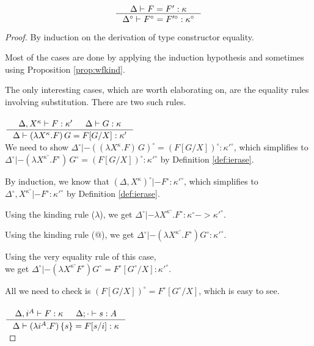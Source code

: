 \begin{theorem}
\[ \inference{\Delta |- F=F':\kappa}
		{\Delta^\circ |- F^\circ=F'^\circ:\kappa^\circ}
\]
\label{thm:ierasetyconeq}
\end{theorem}
\begin{proof}
By induction on the derivation of type constructor equality.

Most of the cases are done by applying the induction hypothesis
and sometimes using Proposition \ref{prop:wfkind}.

The only interesting cases, which are worth elaborating on, are the
equality rules involving substitution.  There are two such rules.

\paragraph{}
  $\inference{\Delta,X^\kappa |- F:\kappa' & \Delta |- G:\kappa}
             {\Delta |- (\lambda X^\kappa.F)\,G = F[G/X]:\kappa'}$ \\

We need to show
$ \Delta^\circ |- ((\lambda X^\kappa.F)\,G)^\circ = (F[G/X])^\circ : \kappa'^\circ $,
which simplifies to 
$ \Delta^\circ |- (\lambda X^{\kappa^\circ}.F^\circ)\,G^\circ = (F[G/X])^\circ : \kappa'^\circ $
by Definition \ref{def:ierase}.

By induction, we know that $(\Delta,X^\kappa)^\circ |- F^\circ : \kappa'^\circ$,
which simplifies to $\Delta^\circ,X^{\kappa^\circ} |- F^\circ : \kappa'^\circ$
by Definition \ref{def:ierase}.

Using the kinding rule ($\lambda$), we get
$\Delta^\circ |- \lambda X^{\kappa^\circ}. F^\circ : \kappa^\circ -> \kappa'^\circ$.

Using the kinding rule ($@$), we get
$\Delta^\circ |- (\lambda X^{\kappa^\circ}. F^\circ) G^\circ : \kappa'^\circ$.

Using the very equality rule of this case,\\ we get 
$\Delta^\circ |- (\lambda X^{\kappa^\circ} F^\circ) G^\circ =
F^\circ[G^\circ/X] : \kappa'^\circ$.

All we need to check is $(F[G/X])^\circ = F^\circ[G^\circ/X]$,
which is easy to see.

\paragraph{}
  $\inference{\Delta,i^A |- F:\kappa & \Delta;\cdot |- s:A}
             {\Delta |- (\lambda i^A.F)\,\{s\} = F[s/i]:\kappa}$ \\


\end{proof}
